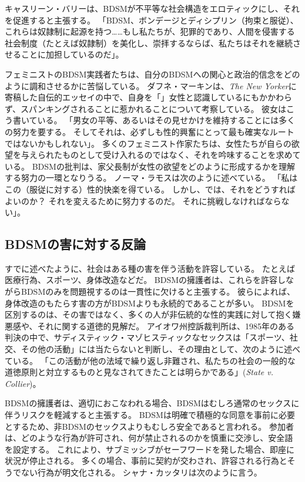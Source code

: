 \documentclass[paper=a4,book,openany]{jlreq} \usepackage{mystyle}
\begin{document}
キャスリーン・バリーは、BDSMが不平等な社会構造をエロティックにし、それを促進すると主張する。
「BDSM、ボンデージとディシプリン（拘束と服従）、これらは奴隷制に起源を持つ……もし私たちが、犯罪的であり、人間を侵害する社会制度（たとえば奴隷制）を美化し、崇拝するならば、私たちはそれを継続させることに加担しているのだ」\citep{murphy12:_part_two_two_part_series_bdsm_femin}。

フェミニストのBDSM実践者たちは、自分のBDSMへの関心と政治的信念をどのように調和させるかに苦悩している。
ダフネ・マーキンは、\emph{The New Yorker}に寄稿した自伝的エッセイの中で、自身を「」女性と認識しているにもかかわらず、スパンキングされることに惹かれることについて考察している。
彼女はこう書いている。
「男女の平等、あるいはその見せかけを維持することには多くの努力を要する。
そしてそれは、必ずしも性的興奮にとって最も確実なルートではないかもしれない」\citep{merkin96:_unlik_obses}。
多くのフェミニスト作家たちは、女性たちが自らの欲望を与えられたものとして受け入れるのではなく、それを吟味することを求めている。
BDSMの批判は、家父長制が女性の欲望をどのように形成するかを理解する努力の一環となりうる。
ノーマ・ラモスは次のように述べている。
「私はこの（服従に対する）性的快楽を得ている。
しかし、では、それをどうすればよいのか？ それを変えるために努力するのだ。
それに挑戦しなければならない」\citep[p.62]{gillespie95:_where_do_we_stand_pornog}。

\subsection{BDSMの害に対する反論}

すでに述べたように、社会はある種の害を伴う活動を許容している。
たとえば医療行為、スポーツ、身体改造などだ。
BDSMの擁護者は、これらを許容しながらBDSMのみを問題視するのは一貫性に欠けると主張する。
彼らによれば、身体改造のもたらす害の方がBDSMよりも永続的であることが多い。
BDSMを区別するのは、その害ではなく、多くの人が非伝統的な性的実践に対して抱く嫌悪感や、それに関する道徳的見解だ。
アイオワ州控訴裁判所は、1985年のある判決の中で、サディスティック・マゾヒスティックなセックスは「スポーツ、社交、その他の活動」には当たらないと判断し、その理由として、次のように述べている。
「この活動が他の法域で繰り返し非難され、私たちの社会の一般的な道徳原則と対立するものと見なされてきたことは明らかである」(\emph{State v. Collier})。

BDSMの擁護者は、適切におこなわれる場合、BDSMはむしろ通常のセックスに伴うリスクを軽減すると主張する。
BDSMは明確で積極的な同意を事前に必要とするため、非BDSMのセックスよりもむしろ安全であると言われる。
参加者は、どのような行為が許可され、何が禁止されるのかを慎重に交渉し、安全語を設定する。
これにより、サブミッシブがセーフワードを発した場合、即座に状況が停止される。
多くの場合、事前に契約が交わされ、許容される行為とそうでない行為が明文化される。
シャナ・カッタリは次のように言う。
\end{document}
